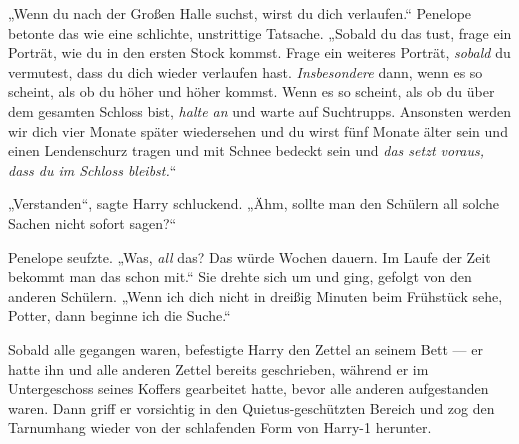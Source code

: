 „Wenn du nach der Großen Halle suchst, wirst du dich verlaufen.“ Penelope betonte das wie eine schlichte, unstrittige Tatsache.
„Sobald du das tust, frage ein Porträt, wie du in den ersten Stock kommst. Frage ein weiteres Porträt, \emph{sobald} du vermutest, dass du dich wieder verlaufen hast. \emph{Insbesondere} dann, wenn es so scheint, als ob du höher und höher kommst. Wenn es so scheint, als ob du über dem gesamten Schloss bist, \emph{halte an} und warte auf Suchtrupps. Ansonsten werden wir dich vier Monate später wiedersehen und du wirst fünf Monate älter sein und einen Lendenschurz tragen und mit Schnee bedeckt sein und \emph{das setzt voraus, dass du \emph{im} Schloss bleibst.}“

„Verstanden“, sagte Harry schluckend. „Ähm, sollte man den Schülern all solche Sachen nicht sofort sagen?“

Penelope seufzte.
„Was, \emph{all} das? Das würde Wochen dauern. Im Laufe der Zeit bekommt man das schon mit.“ Sie drehte sich um und ging, gefolgt von den anderen Schülern.
„Wenn ich dich nicht in dreißig Minuten beim Frühstück sehe, Potter, dann beginne ich die Suche.“

Sobald alle gegangen waren, befestigte Harry den Zettel an seinem Bett — er hatte ihn und alle anderen Zettel bereits geschrieben, während er im Untergeschoss seines Koffers gearbeitet hatte, bevor alle anderen aufgestanden waren. Dann griff er vorsichtig in den Quietus-geschützten Bereich und zog den Tarnumhang wieder von der schlafenden Form von Harry-1 herunter.


